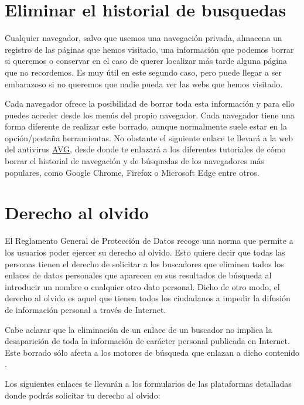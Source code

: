 \documentclass[
  spanish,
  a4paper,
  openany]{book}
\begin{document}
\hypertarget{eliminar-el-historial-de-busquedas}{%
\section{Eliminar el historial de busquedas}\label{eliminar-el-historial-de-busquedas}}

Cualquier navegador, salvo que usemos una navegación privada, almacena un registro de las páginas que hemos visitado, una información que podemos borrar si queremos o conservar en el caso de querer localizar más tarde alguna página que no recordemos. Es muy útil en este segundo caso, pero puede llegar a ser embarazoso si no queremos que nadie pueda ver las webs que hemos visitado.

Cada navegador ofrece la posibilidad de borrar toda esta información y para ello puedes acceder desde los menús del propio navegador. Cada navegador tiene una forma diferente de realizar este borrado, aunque normalmente suele estar en la opción/pestaña herramientas. No obstante el siguiente enlace te llevará a la web del antivirus \href{https://www.avg.com/es/signal/how-to-clear-your-browsing-and-search-history}{AVG}, desde donde te enlazará a los diferentes tutoriales de cómo borrar el historial de navegación y de búsquedas de los navegadores más populares, como Google Chrome, Firefox o Microsoft Edge entre otros.

\hypertarget{derecho-al-olvido}{%
\section{Derecho al olvido}\label{derecho-al-olvido}}

El Reglamento General de Protección de Datos recoge una norma que permite a los usuarios poder ejercer su derecho al olvido. Esto quiere decir que todas las personas tienen el derecho de solicitar a los buscadores que eliminen todos los enlaces de datos personales que aparecen en sus resultados de búsqueda al introducir un nombre o cualquier otro dato personal. Dicho de otro modo, el derecho al olvido es aquel que tienen todos los ciudadanos a impedir la difusión de información personal a través de Internet.

Cabe aclarar que la eliminación de un enlace de un buscador no implica la desaparición de toda la información de carácter personal publicada en Internet. Este borrado sólo afecta a los motores de búsqueda que enlazan a dicho contenido \citep{OSI-derecho-al-olvido}.

Los siguientes enlaces te llevarán a los formularios de las plataformas detalladas donde podrás solicitar tu derecho al olvido:
\end{document}
